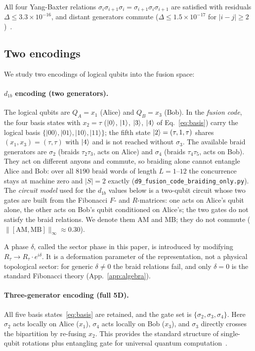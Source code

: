 \documentclass[aps,pra,twocolumn,superscriptaddress,longbibliography,floatfix,nofootinbib]{revtex4-2}
\begin{document}
All four Yang-Baxter relations
$\sigma_i\sigma_{i+1}\sigma_i = \sigma_{i+1}\sigma_i\sigma_{i+1}$
are satisfied with residuals $\Delta \leq 3.3\times 10^{-16}$, and
distant generators commute ($\Delta \leq 1.5\times 10^{-17}$ for
$|i-j|\geq 2$)~\cite{Sayim2026topological}.

\subsection{Two encodings}
\label{sec:encodings}

We study two encodings of logical qubits into the fusion space:

\paragraph{$d_{1b}$ encoding (two generators).}
The logical qubits are $Q_A = x_1$ (Alice) and $Q_B = x_3$ (Bob). In the
\emph{fusion code}, the four basis states with $x_2 = \tau$ ($\ket{0}$,
$\ket{1}$, $\ket{3}$, $\ket{4}$ of Eq.~\eqref{eq:basis}) carry the
logical basis $\{|00\rangle, |01\rangle, |10\rangle, |11\rangle\}$; the
fifth state $\ket{2} = (\tau,1,\tau)$ shares $(x_1,x_3) = (\tau,\tau)$
with $\ket{4}$ and is not reached without $\sigma_3$. The available
braid generators are $\sigma_2$ (braids $\tau_2\tau_3$, acts on Alice)
and $\sigma_4$ (braids $\tau_4\tau_5$, acts on Bob). They act on
different anyons and commute, so braiding alone cannot entangle Alice
and Bob: over all $8190$ braid words of length $L=1$--$12$ the
concurrence stays at machine zero and $|S| = 2$ exactly
(\texttt{d9\_fusion\_code\_braiding\_only.py}). The \emph{circuit model}
used for the $d_{1b}$ values below is a two-qubit circuit whose two
gates are built from the Fibonacci $F$- and $R$-matrices: one acts on
Alice's qubit alone, the other acts on Bob's qubit conditioned on
Alice's; the two gates do not satisfy the braid relations. We denote
them AM and MB; they do not commute ($\|[\text{AM},\text{MB}]\|_\infty
\approx 0.30$).

A phase $\delta$, called the sector phase in this paper, is introduced
by modifying $R_\tau \to R_\tau \cdot e^{i\delta}$. It is a deformation
parameter of the representation, not a physical topological sector: for
generic $\delta \neq 0$ the braid relations fail, and only $\delta = 0$
is the standard Fibonacci theory (App.~\ref{app:algebra}).

\paragraph{Three-generator encoding (full 5D).}
All five basis states~\eqref{eq:basis} are retained, and the gate
set is $\{\sigma_2,\sigma_3,\sigma_4\}$.
Here $\sigma_2$ acts locally on Alice ($x_1$), $\sigma_4$ acts
locally on Bob ($x_3$), and $\sigma_3$ directly crosses the
bipartition by re-fusing $x_2$.
This provides the standard structure of
single-qubit rotations plus entangling gate for universal
quantum computation~\cite{Bonesteel2005}.
\end{document}
